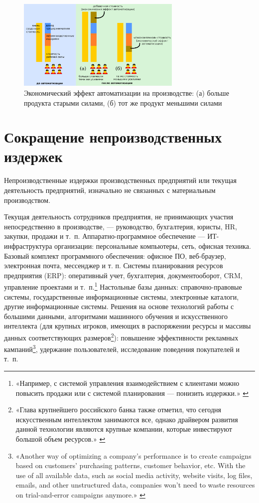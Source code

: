\documentclass{article}
\begin{document}
\begin{figure}[h]
    \centering
    \includegraphics[width=0.70\textwidth]{effect-manufacturing}
    \caption{Экономический эффект автоматизации на производстве: (а) больше продукта старыми силами, (б) тот же продукт меньшими силами}
    \label{fig:effect_manufacturing}
\end{figure}

\section*{Сокращение непроизводственных издержек}

Непроизводственные издержки производственных предприятий или текущая деятельность предприятий, изначально не связанных с материальным производством.

Текущая деятельность сотрудников предприятия, не принимающих участия непосредственно в производстве, — руководство, бухгалтерия, юристы, HR, закупки, продажи и т. п. Аппаратно-программное обеспечение — ИТ-инфраструктура организации: персональные компьютеры, сеть, офисная техника. Базовый комплект программного обеспечения: офисное ПО, веб-браузер, электронная почта, мессенджер и т. п. Системы планирования ресурсов предприятия (ERP): оперативный учет, бухгалтерия, документооборот, CRM, управление проектами и т. п.\footnote{«Например, с системой управления взаимодействием с клиентами можно повысить продажи или с системой планирования — понизить издержки.» \cite{vedomostiItIsReal}} Настольные базы данных: справочно-правовые системы, государственные информационные системы, электронные каталоги, другие информационные системы. Решения на основе технологий работы с большими данными, алгоритмами машинного обучения и искусственного интеллекта (для крупных игроков, имеющих в распоряжении ресурсы и массивы данных соответствующих размеров\footnote{«Глава крупнейшего российского банка также отметил, что сегодня искусственным интеллектом занимаются все, однако драйвером развития данной технологии являются крупные компании, которые инвестируют большой объем ресурсов.» \cite{sberAiLoss2019}}): повышение эффективности рекламных кампаний\footnote{«Another way of optimizing a company’s performance is to create campaigns based on customers’ purchasing patterns, customer behavior, etc. With the use of all available data, such as social media activity, website visits, log files, emails, and other unstructured data, companies won’t need to waste resources on trial-and-error campaigns anymore.» \cite{marketingBigData2022}}, удержание пользователей, исследование поведения покупателей и т. п.
\end{document}
